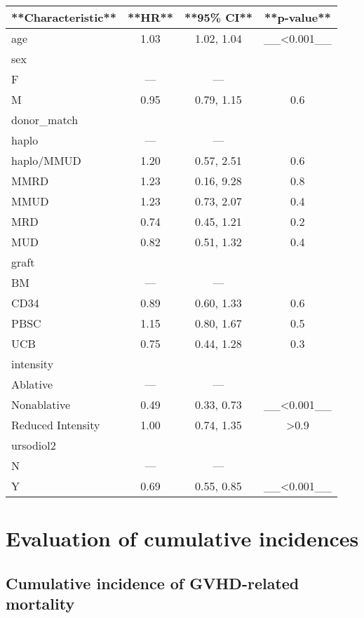 \documentclass[
]{book}
\begin{document}
\begin{tabular}{l|c|c|c}
\hline
**Characteristic** & **HR** & **95\% CI** & **p-value**\\
\hline
age & 1.03 & 1.02, 1.04 & \_\_<0.001\_\_\\
\hline
sex &  &  & \\
\hline
F & — & — & \\
\hline
M & 0.95 & 0.79, 1.15 & 0.6\\
\hline
donor\_match &  &  & \\
\hline
haplo & — & — & \\
\hline
haplo/MMUD & 1.20 & 0.57, 2.51 & 0.6\\
\hline
MMRD & 1.23 & 0.16, 9.28 & 0.8\\
\hline
MMUD & 1.23 & 0.73, 2.07 & 0.4\\
\hline
MRD & 0.74 & 0.45, 1.21 & 0.2\\
\hline
MUD & 0.82 & 0.51, 1.32 & 0.4\\
\hline
graft &  &  & \\
\hline
BM & — & — & \\
\hline
CD34 & 0.89 & 0.60, 1.33 & 0.6\\
\hline
PBSC & 1.15 & 0.80, 1.67 & 0.5\\
\hline
UCB & 0.75 & 0.44, 1.28 & 0.3\\
\hline
intensity &  &  & \\
\hline
Ablative & — & — & \\
\hline
Nonablative & 0.49 & 0.33, 0.73 & \_\_<0.001\_\_\\
\hline
Reduced Intensity & 1.00 & 0.74, 1.35 & >0.9\\
\hline
ursodiol2 &  &  & \\
\hline
N & — & — & \\
\hline
Y & 0.69 & 0.55, 0.85 & \_\_<0.001\_\_\\
\hline
\end{tabular}

\hypertarget{evaluation-of-cumulative-incidences}{%
\section{Evaluation of cumulative incidences}\label{evaluation-of-cumulative-incidences}}

\hypertarget{cumulative-incidence-of-gvhd-related-mortality}{%
\subsection{Cumulative incidence of GVHD-related mortality}\label{cumulative-incidence-of-gvhd-related-mortality}}
\end{document}
